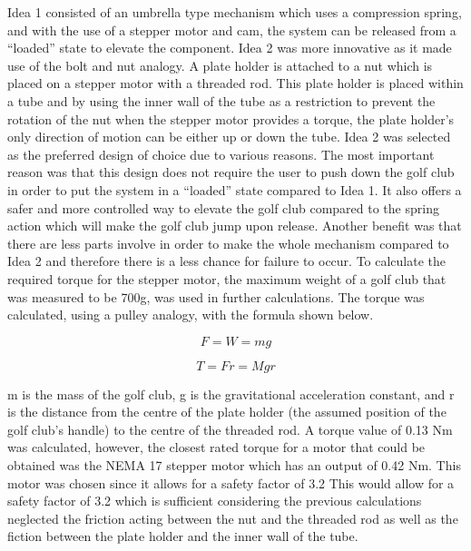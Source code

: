 \documentclass[11pt,landscape]{article}
\begin{document}
\begin{multicols}{2}
    
    Idea 1 consisted of an umbrella type mechanism which uses a compression
    spring, and with the use of a stepper motor and cam, the system can be
    released from a “loaded” state to elevate the component. Idea 2 was more
    innovative as it made use of the bolt and nut analogy. A plate holder is
    attached to a nut which is placed on a stepper motor with a threaded rod.
    This plate holder is placed within a tube and by using the inner wall of the
    tube as a restriction to prevent the rotation of the nut when the stepper
    motor provides a torque, the plate holder’s only direction of motion can be
    either up or down the tube. Idea 2 was selected as the preferred design of
    choice due to various reasons. The most important reason was that this
    design does not require the user to push down the golf club in order to put
    the system in a “loaded” state compared to Idea 1. It also offers a safer
    and more controlled way to elevate the golf club compared to the spring
    action which will make the golf club jump upon release. Another benefit was
    that there are less parts involve in order to make the whole mechanism
    compared to Idea 2 and therefore there is a less chance for failure to
    occur. To calculate the required torque for the stepper motor, the maximum
    weight of a golf club that was measured to be 700g, was used in further
    calculations. The torque was calculated, using a pulley analogy, with the
    formula shown below.
    
    \newpage
    
    \begin{center}
        \begin{equation}
            F = W = mg
            \label{eq:raising_force}
        \end{equation}
    \end{center}
    \begin{center}
        \begin{equation}
            T = Fr = Mgr
            \label{eq:raising_torque}
        \end{equation}
    \end{center}
    
    m is the mass of the golf club, g is the gravitational acceleration
    constant, and r is the distance from the centre of the plate holder (the
    assumed position of the golf club’s handle) to the centre of the threaded
    rod. A torque value of 0.13 Nm was calculated, however, the closest rated
    torque for a motor that could be obtained was the NEMA 17 stepper motor
    which has an output of 0.42 Nm. This motor was chosen since it allows for a
    safety factor of 3.2 This would allow for a safety factor of 3.2 which is
    sufficient considering the previous calculations neglected the friction
    acting between the nut and the threaded rod as well as the fiction between
    the plate holder and the inner wall of the tube. 
    

\end{multicols}
\end{document}
